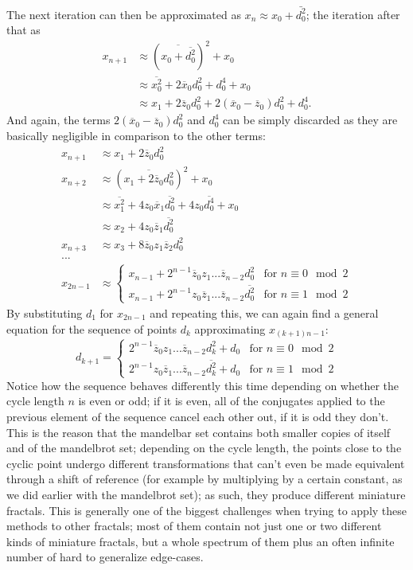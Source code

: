 \documentclass[12pt,a4paper]{article}
\begin{document}
The next iteration can then be approximated as $x_n\approx x_0+\bar{d_0^2}$; the iteration after that as
\begin{align*}
	x_{n+1} &\approx (\overline{x_0+\overline{d_0^2}})^2+x_0\\
	&\approx \overline{x_0^2}+2\overline{x}_0d_0^2+d_0^4+x_0\\
	&\approx x_1+2\overline{z}_0d_0^2+2(\overline{x}_0-\overline{z}_0)d_0^2+d_0^4.
\end{align*}
And again, the terms $2(\overline{x}_0-\overline{z}_0)d_0^2$ and $d_0^4$ can be simply discarded as they are basically negligible in comparison to the other terms:
\begin{align*}
	x_{n+1} &\approx x_1+2\overline{z}_0d_0^2\\
	x_{n+2} &\approx (\overline{x_1+2\overline{z}_0d_0^2})^2+x_0\\
	&\approx \overline{x_1^2}+4z_0\overline{x}_1\overline{d_0^2}+4z_0\overline{d_0^4}+x_0\\
	&\approx x_2+4z_0\overline{z}_1\overline{d_0^2}\\
	x_{n+3} &\approx x_3+8\overline{z}_0z_1\overline{z}_2d_0^2\\
	...\\
	x_{2n-1} &\approx \begin{cases}
		x_{n-1}+2^{n-1}\overline{z}_0z_1...\overline{z}_{n-2}d_0^2 & \text{for } n \equiv 0 \mod 2\\
		x_{n-1}+2^{n-1}z_0\overline{z}_1...\overline{z}_{n-2}\overline{d_0^2} & \text{for } n \equiv 1 \mod 2
	\end{cases}
\end{align*}
By substituting $d_1$ for $x_{2n-1}$ and repeating this, we can again find a general equation for the sequence of points $d_k$ approximating $x_{(k+1)n-1}$:
$$d_{k+1} = \begin{cases}
2^{n-1}\overline{z}_0z_1...\overline{z}_{n-2}d_k^2+d_0 & \text{for } n \equiv 0 \mod 2\\
2^{n-1}z_0\overline{z}_1...\overline{z}_{n-2}\overline{d_k^2}+d_0 & \text{for } n \equiv 1 \mod 2
\end{cases}$$
Notice how the sequence behaves differently this time depending on whether the cycle length $n$ is even or odd; if it is even, all of the conjugates applied to the previous element of the sequence cancel each other out, if it is odd they don't. This is the reason that the mandelbar set contains both smaller copies of itself and of the mandelbrot set; depending on the cycle length, the points close to the cyclic point undergo different transformations that can't even be made equivalent through a shift of reference (for example by multiplying by a certain constant, as we did earlier with the mandelbrot set); as such, they produce different miniature fractals. This is generally one of the biggest challenges when trying to apply these methods to other fractals; most of them contain not just one or two different kinds of miniature fractals, but a whole spectrum of them plus an often infinite number of hard to generalize edge-cases.
\end{document}
